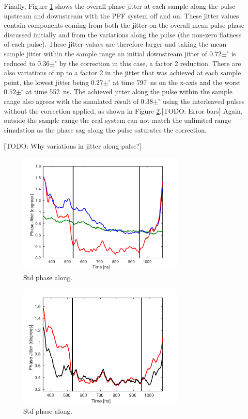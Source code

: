 Finally, Figure \ref{f:BestFF_StdPhaseAlong} shows the overall phase jitter at each sample along the pulse upstream and downstream with the PFF system off and on. These jitter values contain components coming from both the jitter on the overall mean pulse phase discussed initially and from the variations along the pulse (the non-zero flatness of each pulse). These jitter values are therefore larger and taking the mean sample jitter within the sample range an initial downstream jitter of \(0.72\pm^\circ\) is reduced to \(0.36\pm^\circ\) by the correction in this case, a factor 2 reduction. There are also variations of up to a factor 2 in the jitter that was achieved at each sample point, the lowest jitter being \(0.27\pm^\circ\) at time 797~ns on the x-axis and the worst \(0.52\pm^\circ\) at time 552~ns. The achieved jitter along the pulse within the sample range also agrees with the simulated result of \(0.38\pm^\circ\) using the interleaved pulses without the correction applied, as shown in Figure \ref{f:BestFF_SimStdPhaseAlong}.[TODO: Error bars] Again, outside the sample range the real system can not match the unlimited range simulation as the phase sag along the pulse saturates the correction. 

[TODO: Why variations in jitter along pulse?]

\begin{figure}
  \centering
  \includegraphics[width=0.75\textwidth]{Figures/feedforward/BestFF_StdPhaseAlong}
  \caption{Std phase along.}
  \label{f:BestFF_StdPhaseAlong}
\end{figure}

\begin{figure}
  \centering
  \includegraphics[width=0.75\textwidth]{Figures/feedforward/BestFF_SimStdAlongPulse}
  \caption{Std phase along.}
  \label{f:BestFF_SimStdPhaseAlong}
\end{figure}


